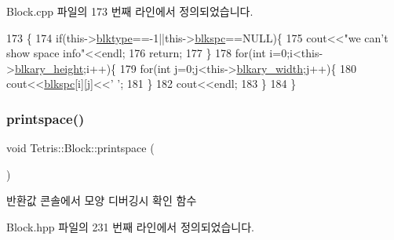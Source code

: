 Block.\+cpp 파일의 173 번째 라인에서 정의되었습니다.


\begin{DoxyCode}
173                       \{
174                 \textcolor{keywordflow}{if}(this->\hyperlink{class_tetris_1_1_block_aceac58dcf8d8afaa82c2bab101cb3cff}{blktype}==-1||this->\hyperlink{class_tetris_1_1_block_af2f96c83a3511d32321672f794aa4db1}{blkspc}==NULL)\{
175                     cout<<\textcolor{stringliteral}{"we can't show space info"}<<endl;
176                     \textcolor{keywordflow}{return};
177                 \}
178                 \textcolor{keywordflow}{for}(\textcolor{keywordtype}{int} i=0;i<this->\hyperlink{class_tetris_1_1_block_abbea7737c2b1fb7339aab4dff13de27c}{blkary\_height};i++)\{
179                     \textcolor{keywordflow}{for}(\textcolor{keywordtype}{int} j=0;j<this->\hyperlink{class_tetris_1_1_block_a96548cab58eb788af744b54192c7bea1}{blkary\_width};j++)\{
180                         cout<<\hyperlink{class_tetris_1_1_block_af2f96c83a3511d32321672f794aa4db1}{blkspc}[i][j]<<\textcolor{charliteral}{' '};
181                     \}
182                     cout<<endl;
183                 \}
184             \}
\end{DoxyCode}
\mbox{\label{class_tetris_1_1_block_ae7aadeec449fec232e9635d839593028}} 
\subsubsection{\texorpdfstring{printspace()}{printspace()}\hspace{0.1cm}{\footnotesize\ttfamily [2/2]}}
{\footnotesize\ttfamily void Tetris\+::\+Block\+::printspace (\begin{DoxyParamCaption}{ }\end{DoxyParamCaption})\hspace{0.3cm}{\ttfamily [inline]}}

\begin{DoxyReturn}{반환값}
콘솔에서 모양 디버깅시 확인 함수 
\end{DoxyReturn}


Block.\+hpp 파일의 231 번째 라인에서 정의되었습니다.


